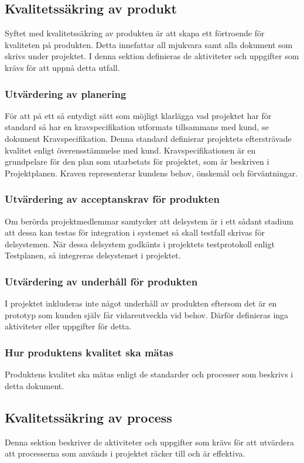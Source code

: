 \documentclass[a4paper,10pt]{article}
\begin{document}
\subsection{Kvalitetssäkring av produkt}
Syftet med kvalitetssäkring av produkten är att skapa ett förtroende för kvaliteten på produkten. Detta innefattar all mjukvara samt alla dokument som skrivs under projektet. I denna sektion definieras de aktiviteter och uppgifter som krävs för att uppnå detta utfall.
\subsubsection{Utvärdering av planering}
För att på ett så entydigt sätt som möjligt klarlägga vad projektet har för standard så har en kravspecifikation utformats tillsammans med kund, se dokument Kravspecifikation.
Denna standard definierar projektets eftersträvade kvalitet enligt överensstämmelse med kund.
Kravspecifikationen är en grundpelare för den plan som utarbetats för projektet, som är beskriven i Projektplanen. Kraven representerar kundens behov, önskemål och förväntningar.
\subsubsection{Utvärdering av acceptanskrav för produkten}
Om berörda projektmedlemmar samtycker att delsystem är i ett sådant stadium att dessa kan testas för integration i systemet så skall testfall skrivas för delsystemen. När dessa delsystem godkänts i projektets testprotokoll enligt Testplanen, så integreras delsystemet i projektet.
\subsubsection{Utvärdering av underhåll för produkten}
I projektet inkluderas inte något underhåll av produkten eftersom det är en prototyp som kunden själv får vidareutveckla vid behov. Därför definieras inga aktiviteter eller uppgifter för detta.
\subsubsection{Hur produktens kvalitet ska mätas}
Produktens kvalitet ska mätas enligt de standarder och processer som beskrivs i detta dokument.
\subsection{Kvalitetssäkring av process}
Denna sektion beskriver de aktiviteter och uppgifter som krävs för att utvärdera att processerna som används i projektet räcker till och är effektiva.
\end{document}
